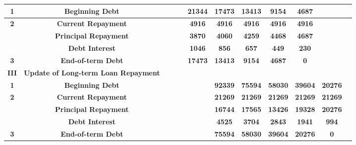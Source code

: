 \documentclass[12pt]{article}
\begin{document}
\begin{table}[htbp]
\begin{tabular}{|c|c|c|c|c|c|c|c|c|c|c|c|}
    \hline
    \rowcolor[rgb]{ .988,  .894,  .839} \textbf{1} & \textbf{Beginning Debt} &       &       &       & \textbf{21344} & \textbf{17473} & \textbf{13413} & \textbf{9154} & \textbf{4687} &       &  \\
    \hline
    \rowcolor[rgb]{ .973,  .796,  .678} \textbf{2} & \textbf{Current Repayment} &       &       &       & \textbf{4916} & \textbf{4916} & \textbf{4916} & \textbf{4916} & \textbf{4916} &       &  \\
    \hline
    \rowcolor[rgb]{ .988,  .894,  .839}       & \textbf{Principal Repayment} &       &       &       & \textbf{3870} & \textbf{4060} & \textbf{4259} & \textbf{4468} & \textbf{4687} &       &  \\
    \hline
    \rowcolor[rgb]{ .973,  .796,  .678}       & \textbf{Debt Interest} &       &       &       & \textbf{1046} & \textbf{856} & \textbf{657} & \textbf{449} & \textbf{230} &       &  \\
    \hline
    \rowcolor[rgb]{ .988,  .894,  .839} \textbf{3} & \textbf{End-of-term Debt} &       &       &       & \textbf{17473} & \textbf{13413} & \textbf{9154} & \textbf{4687} & \textbf{0} &       &  \\
    \hline
    \rowcolor[rgb]{ .973,  .796,  .678} \textbf{III} & \multicolumn{1}{p{10.055em}|}{\textbf{Update of Long-term \newline{}Loan Repayment}} &       &       &       &       &       &       &       &       &       &  \\
    \hline
    \rowcolor[rgb]{ .988,  .894,  .839} \textbf{1} & \textbf{Beginning Debt} &       &       &       &       & \textbf{92339} & \textbf{75594} & \textbf{58030} & \textbf{39604} & \textbf{20276} &  \\
    \hline
    \rowcolor[rgb]{ .973,  .796,  .678} \textbf{2} & \textbf{Current Repayment} &       &       &       &       & \textbf{21269} & \textbf{21269} & \textbf{21269} & \textbf{21269} & \textbf{21269} &  \\
    \hline
    \rowcolor[rgb]{ .988,  .894,  .839}       & \textbf{Principal Repayment} &       &       &       &       & \textbf{16744} & \textbf{17565} & \textbf{13426} & \textbf{19328} & \textbf{20276} &  \\
    \hline
    \rowcolor[rgb]{ .973,  .796,  .678}       & \textbf{Debt Interest} &       &       &       &       & \textbf{4525} & \textbf{3704} & \textbf{2843} & \textbf{1941} & \textbf{994} &  \\
    \hline
    \rowcolor[rgb]{ .988,  .894,  .839} \textbf{3} & \textbf{End-of-term Debt} &       &       &       &       & \textbf{75594} & \textbf{58030} & \textbf{39604} & \textbf{20276} & \textbf{0} &  \\

\end{tabular}
\end{table}
\end{document}
